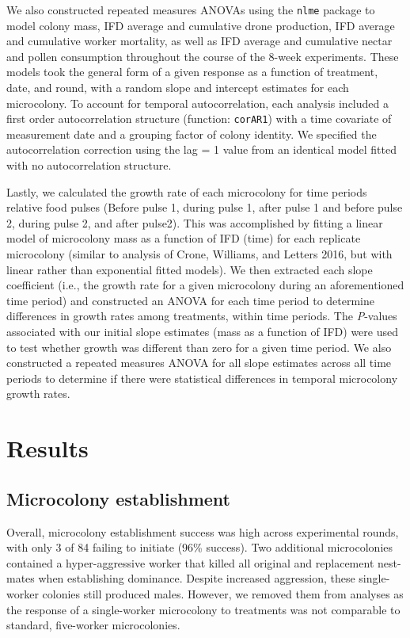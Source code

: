 \documentclass[11pt,]{article}
\begin{document}
We also constructed repeated measures ANOVAs using the \texttt{nlme}
package to model colony mass, IFD average and cumulative drone
production, IFD average and cumulative worker mortality, as well as IFD
average and cumulative nectar and pollen consumption throughout the
course of the 8-week experiments. These models took the general form of
a given response as a function of treatment, date, and round, with a
random slope and intercept estimates for each microcolony. To account
for temporal autocorrelation, each analysis included a first order
autocorrelation structure (function: \texttt{corAR1}) with a time
covariate of measurement date and a grouping factor of colony identity.
We specified the autocorrelation correction using the lag = 1 value from
an identical model fitted with no autocorrelation structure.

Lastly, we calculated the growth rate of each microcolony for time
periods relative food pulses (Before pulse 1, during pulse 1, after
pulse 1 and before pulse 2, during pulse 2, and after pulse2). This was
accomplished by fitting a linear model of microcolony mass as a function
of IFD (time) for each replicate microcolony (similar to analysis of
Crone, Williams, and Letters 2016, but with linear rather than
exponential fitted models). We then extracted each slope coefficient
(i.e., the growth rate for a given microcolony during an aforementioned
time period) and constructed an ANOVA for each time period to determine
differences in growth rates among treatments, within time periods. The
\emph{P}-values associated with our initial slope estimates (mass as a
function of IFD) were used to test whether growth was different than
zero for a given time period. We also constructed a repeated measures
ANOVA for all slope estimates across all time periods to determine if
there were statistical differences in temporal microcolony growth rates.

\hypertarget{results}{%
\section{Results}\label{results}}

\hypertarget{microcolony-establishment}{%
\subsection{Microcolony establishment}\label{microcolony-establishment}}

Overall, microcolony establishment success was high across experimental
rounds, with only 3 of 84 failing to initiate (96\% success). Two
additional microcolonies contained a hyper-aggressive worker that killed
all original and replacement nest-mates when establishing dominance.
Despite increased aggression, these single-worker colonies still
produced males. However, we removed them from analyses as the response
of a single-worker microcolony to treatments was not comparable to
standard, five-worker microcolonies.
\end{document}
